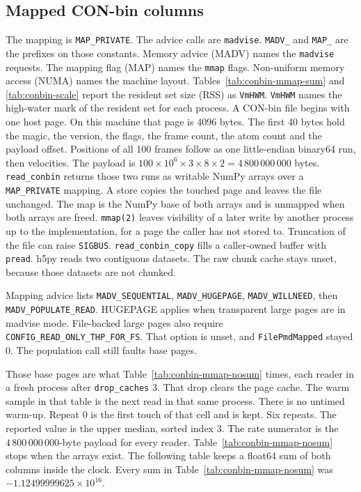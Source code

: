 \subsection{Mapped CON-bin columns} \label{sec:conbin-mmap}

The mapping is \texttt{MAP\_PRIVATE}.
The advice calls are \texttt{madvise}.
\texttt{MADV\_} and \texttt{MAP\_} are the prefixes on those constants.
Memory advice (MADV) names the \texttt{madvise} requests.
The mapping flag (MAP) names the \texttt{mmap} flags.
Non-uniform memory access (NUMA) names the machine layout.
Tables~\ref{tab:conbin-mmap-sum} and \ref{tab:conbin-scale} report the
resident set size (RSS) as \texttt{VmHWM}.
\texttt{VmHWM} names the high-water mark of the resident set for each
process.
A CON-bin file begins with one host page.
On this machine that page is 4096 bytes.
The first 40 bytes hold the magic, the version, the flags, the frame
count, the atom count and the payload offset.
Positions of all 100 frames follow as one little-endian binary64 run,
then velocities.
The payload is
\(100 \times 10^{6} \times 3 \times 8 \times 2 = 4\,800\,000\,000\)
bytes.
\texttt{read\_conbin} returns those two runs as writable NumPy arrays
over a \texttt{MAP\_PRIVATE} mapping.
A store copies the touched page and leaves the file unchanged.
The map is the NumPy base of both arrays and is unmapped when both
arrays are freed.
\texttt{mmap(2)} leaves visibility of a later write by another process
up to the implementation, for a page the caller has not stored to.
Truncation of the file can raise \texttt{SIGBUS}.
\texttt{read\_conbin\_copy} fills a caller-owned buffer with
\texttt{pread}.
h5py reads two contiguous datasets.
The raw chunk cache stays unset, because those datasets are not chunked.

Mapping advice lists \texttt{MADV\_SEQUENTIAL}, \texttt{MADV\_HUGEPAGE},
\texttt{MADV\_WILLNEED}, then \texttt{MADV\_POPULATE\_READ}.
HUGEPAGE applies when transparent large pages are in madvise mode.
File-backed large pages also require
\texttt{CONFIG\_READ\_ONLY\_THP\_FOR\_FS}.
That option is unset, and
\texttt{FilePmdMapped} stayed 0.
The population call still faults base pages.

Those base pages are what Table~\ref{tab:conbin-mmap-nosum} times, each
reader in a fresh process after \texttt{drop\_caches} 3.
That drop clears the page cache.
The warm sample in that table is the next read in that same process.
There is no untimed warm-up.
Repeat 0 is the first touch of that cell and is kept.
Six repeats.
The reported value is the upper median, sorted index 3.
The rate numerator is the \(4\,800\,000\,000\)-byte payload for every
reader.
Table~\ref{tab:conbin-mmap-nosum} stops when the arrays exist.
The following table keeps a float64 sum of both columns inside the
clock.
Every sum in Table~\ref{tab:conbin-mmap-nosum} was
\(-1.12499999625 \times 10^{16}\).

